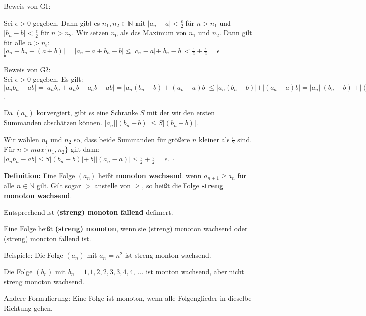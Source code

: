 \begin{frame}[fragile]

Beweis von G1:

Sei $\epsilon > 0$ gegeben. \pause Dann gibt es $n_1, n_2 \in \mathbb{N}$ mit $\vert a_n-a \vert < \frac{\epsilon}{2}$
für $n > n_1$ und $\vert b_n-b \vert < \frac{\epsilon}{2}$ für $n > n_2$. \pause Wir setzen $n_0$ als das Maximum von $n_1$
und $n_2$. \pause Dann gilt für alle $n > n_0$: \\
$\vert a_n + b_n - (a + b) \vert = \vert a_n - a + b_n -b \vert \le \vert a_n - a \vert + \vert b_n - b \vert <
 \frac{\epsilon}{2} +  \frac{\epsilon}{2} = \epsilon$ \\ \hfill $\square$ \pause
 
Beweis von G2: \\
 Sei $\epsilon > 0$ gegeben. \pause Es gilt: \\
$\vert a_n b_n - ab \vert = \vert a_n b_n + a_n b - a_n b - ab \vert =  \vert a_n( b_n - b) + (a_n - a)b \vert
\le  \vert a_n( b_n - b)\vert + \vert (a_n - a)b \vert =  \vert a_n\vert \vert ( b_n - b)\vert + \vert (a_n - a)\vert \vert b\vert$. \pause

Da $(a_n)$ konvergiert, gibt es eine Schranke $S$ mit der wir den ersten Summanden abschätzen können. 
 $ \vert a_n\vert \vert ( b_n - b)\vert  \le S  \vert ( b_n - b)\vert$. \pause
 
 Wir wählen $n_1$ und $n_2$ so, dass beide Summanden für größere $n$ kleiner als $\frac{\epsilon}{2}$ sind. \pause
 Für $n > max\{n_1, n_2\}$ gilt dann:
$\vert a_n b_n - ab  \vert  \le S  \vert ( b_n - b)\vert + \vert b\vert\vert (a_n - a)\vert \le \frac{\epsilon}{2} + \frac{\epsilon}{2} = \epsilon$. \hfill $\square$ 

\end{frame}

\begin{frame}[fragile]
\textbf{Definition:} Eine Folge $(a_n)$ heißt \textbf{monoton wachsend}, wenn $a_{n+1} \ge a_n$ für
alle $n\in \mathbb{N}$ gilt. Gilt sogar $>$ anstelle von $\ge$, so heißt die Folge \textbf{streng monoton
wachsend}. \pause

Entsprechend ist \textbf{(streng) monoton fallend} definiert. \pause

Eine Folge heißt \textbf{(streng) monoton}, wenn sie (streng) monoton wachsend oder
(streng) monoton fallend ist. \pause

Beispiele: Die Folge $(a_n)$ mit $a_n = n^2$ \pause ist streng monton wachsend. \pause

Die Folge $(b_n)$ mit $b_n = 1,1,2,2,3,3,4,4,....$ \pause ist monton wachsend, aber nicht streng monoton wachsend. \pause

Andere Formulierung: Eine Folge ist monoton, wenn alle Folgenglieder in dieselbe Richtung gehen.
\end{frame}

